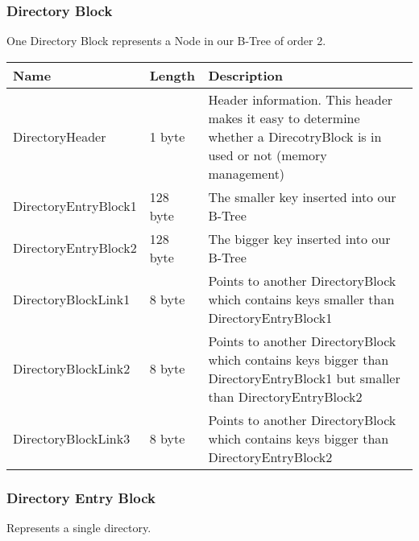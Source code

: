\subsubsection*{Directory Block}

One Directory Block represents a Node in our B-Tree of order 2.

\begin{tabular}{|l|l|p{5cm}|}
\hline
  \textbf{Name} & \textbf{Length} & \textbf{Description}
\\  \hline

DirectoryHeader & 1 byte & Header information. This header makes it easy to determine whether a DirecotryBlock is in used or not (memory management)

\\  \hline

DirectoryEntryBlock1 & 128 byte & The smaller key inserted into our B-Tree

\\  \hline

DirectoryEntryBlock2 & 128 byte & The bigger key inserted into our B-Tree

\\  \hline

DirectoryBlockLink1 & 8 byte & Points to another DirectoryBlock which contains keys smaller than DirectoryEntryBlock1

\\  \hline

DirectoryBlockLink2 & 8 byte & Points to another DirectoryBlock which contains keys bigger than DirectoryEntryBlock1 but smaller than DirectoryEntryBlock2

\\  \hline

DirectoryBlockLink3 & 8 byte & Points to another DirectoryBlock which contains keys bigger than DirectoryEntryBlock2

\\  \hline


\end{tabular}

\subsubsection*{Directory Entry Block}

Represents a single directory.

